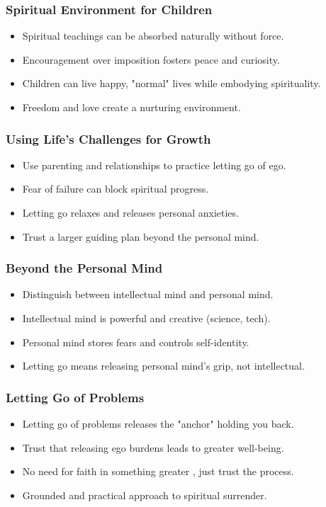 \begin{frame}[fragile]\frametitle{Spiritual Environment for Children}
  \begin{itemize}
    \item Spiritual teachings can be absorbed naturally without force.
    \item Encouragement over imposition fosters peace and curiosity.
    \item Children can live happy, "normal" lives while embodying spirituality.
    \item Freedom and love create a nurturing environment.
  \end{itemize}
\end{frame}

\begin{frame}[fragile]\frametitle{Using Life’s Challenges for Growth}
  \begin{itemize}
    \item Use parenting and relationships to practice letting go of ego.
    \item Fear of failure can block spiritual progress.
    \item Letting go relaxes and releases personal anxieties.
    \item Trust a larger guiding plan beyond the personal mind.
  \end{itemize}
\end{frame}

\begin{frame}[fragile]\frametitle{Beyond the Personal Mind}
  \begin{itemize}
    \item Distinguish between intellectual mind and personal mind.
    \item Intellectual mind is powerful and creative (science, tech).
    \item Personal mind stores fears and controls self-identity.
    \item Letting go means releasing personal mind's grip, not intellectual.
  \end{itemize}
\end{frame}

\begin{frame}[fragile]\frametitle{Letting Go of Problems}
  \begin{itemize}
    \item Letting go of problems releases the "anchor" holding you back.
    \item Trust that releasing ego burdens leads to greater well-being.
    \item No need for faith in something greater ,  just trust the process.
    \item Grounded and practical approach to spiritual surrender.
  \end{itemize}
\end{frame}

